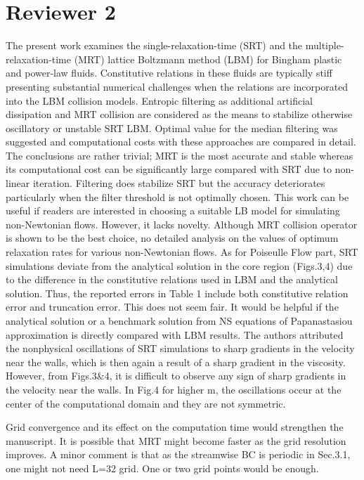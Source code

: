 \documentclass{article}
\begin{document}
	\section{Reviewer 2}
	  The present work examines the single-relaxation-time (SRT) and the multiple-relaxation-time (MRT) lattice Boltzmann method (LBM) for Bingham plastic and power-law fluids. Constitutive relations in these fluids are typically stiff presenting substantial numerical challenges when the relations are incorporated into the LBM collision models. Entropic filtering as additional artificial dissipation and MRT collision are considered as the means to stabilize otherwise oscillatory or unstable SRT LBM. Optimal value for the median filtering was suggested and computational costs with these approaches are compared in detail. The conclusions are rather trivial; MRT is the most accurate and stable whereas its computational cost can be significantly large compared with SRT due to non-linear iteration. Filtering does stabilize SRT but the accuracy deteriorates particularly when the filter threshold is not optimally chosen. This work can be useful if readers are interested in choosing a suitable LB model for simulating non-Newtonian flows. However, it lacks novelty. Although MRT collision operator is shown to be the best choice, no detailed analysis on the values of optimum relaxation rates for various non-Newtonian flows.
	As for Poiseulle Flow part, SRT simulations deviate from the analytical solution in the core region (Figs.3,4) due to the difference in the constitutive relations used in LBM and the analytical solution. Thus, the reported errors in Table 1 include both constitutive relation error and truncation error. This does not seem fair. It would be helpful if the analytical solution or a benchmark solution from NS equations of Papanastasiou approximation is directly compared with LBM results. The authors attributed the nonphysical oscillations of SRT simulations to sharp gradients in the velocity near the walls, which is then again a result of a sharp gradient in the viscosity. However, from Figs.3&4, it is difficult to observe any sign of sharp gradients in the velocity near the walls. In Fig.4 for higher m, the oscillations occur at the center of the computational domain and they are not symmetric.
	
	Grid convergence and its effect on the computation time would strengthen the manuscript. It is possible that MRT might become faster as the grid resolution improves. A minor comment is that as the streamwise BC is periodic in Sec.3.1, one might not need L=32 grid. One or two grid points would be enough.
\end{document}
